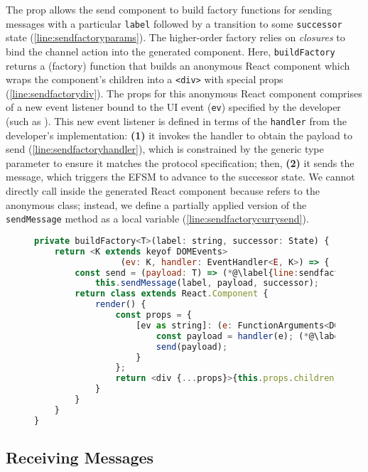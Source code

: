 The prop allows the send component to build factory functions
for sending messages with a particular \texttt{label}
followed by a transition to some \texttt{successor} state
(\cref{line:sendfactoryparams}).
The higher-order factory relies on \textit{closures}
to bind the channel action into the generated component.
Here, \texttt{buildFactory} returns a (factory) function that
builds an anonymous React component which wraps the 
component's children into a \texttt{<div>} with special props 
(\cref{line:sendfactorydiv}).
The props for this anonymous React component comprises of a new
event listener bound to the UI event (\texttt{ev})
specified by the developer (such as ).
This new event listener is defined in terms of the
\texttt{handler} from the developer's implementation:
\textbf{(1)} it invokes the handler to obtain the payload to send 
(\cref{line:sendfactoryhandler}), which is constrained by
the generic type parameter to ensure it matches the protocol specification;
then, \textbf{(2)} it sends the message, which triggers the EFSM
to advance to the successor state.
We cannot directly call  inside
the generated React component because  refers
to the anonymous class; instead, we define a partially applied
version of the \texttt{sendMessage} method as a local variable 
(\cref{line:sendfactorycurrysend}).

\begin{figure}[!h]
\begin{lstlisting}[language=javascript,tabsize=2]
private buildFactory<T>(label: string, successor: State) { (*@\label{line:sendfactoryparams}@*)
	return <K extends keyof DOMEvents>
				 (ev: K, handler: EventHandler<E, K>) => {
		const send = (payload: T) => (*@\label{line:sendfactorycurrysend}@*)
			this.sendMessage(label, payload, successor);
		return class extends React.Component {
			render() {
				const props = {
					[ev as string]: (e: FunctionArguments<DOMEvents[K]>) => {
						const payload = handler(e); (*@\label{line:sendfactoryhandler}@*)
						send(payload);
					}
				};
				return <div {...props}>{this.props.children}</div> (*@\label{line:sendfactorydiv}@*)
			}		
		}	
	}
}
\end{lstlisting}
\label{lst:reactsendfactory}
\end{figure}

\subsection{Receiving Messages}

